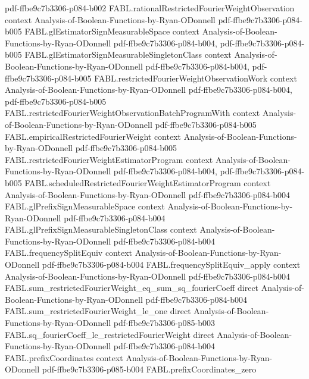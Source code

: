 \begin{theorem}
  {pdf-ffbe9c7b3306-p084-b002}
\proofstep
  {FABL.rationalRestrictedFourierWeightObservation}
  {context}
  {Analysis-of-Boolean-Functions-by-Ryan-ODonnell}
  {pdf-ffbe9c7b3306-p084-b005}
\proofstep
  {FABL.glEstimatorSignMeasurableSpace}
  {context}
  {Analysis-of-Boolean-Functions-by-Ryan-ODonnell}
  {pdf-ffbe9c7b3306-p084-b004,
    pdf-ffbe9c7b3306-p084-b005}
\proofstep
  {FABL.glEstimatorSignMeasurableSingletonClass}
  {context}
  {Analysis-of-Boolean-Functions-by-Ryan-ODonnell}
  {pdf-ffbe9c7b3306-p084-b004,
    pdf-ffbe9c7b3306-p084-b005}
\proofstep
  {FABL.restrictedFourierWeightObservationWork}
  {context}
  {Analysis-of-Boolean-Functions-by-Ryan-ODonnell}
  {pdf-ffbe9c7b3306-p084-b004,
    pdf-ffbe9c7b3306-p084-b005}
\proofstep
  {FABL.restrictedFourierWeightObservationBatchProgramWith}
  {context}
  {Analysis-of-Boolean-Functions-by-Ryan-ODonnell}
  {pdf-ffbe9c7b3306-p084-b005}
\proofstep
  {FABL.empiricalRestrictedFourierWeight}
  {context}
  {Analysis-of-Boolean-Functions-by-Ryan-ODonnell}
  {pdf-ffbe9c7b3306-p084-b005}
\proofstep
  {FABL.restrictedFourierWeightEstimatorProgram}
  {context}
  {Analysis-of-Boolean-Functions-by-Ryan-ODonnell}
  {pdf-ffbe9c7b3306-p084-b004,
    pdf-ffbe9c7b3306-p084-b005}
\proofstep
  {FABL.scheduledRestrictedFourierWeightEstimatorProgram}
  {context}
  {Analysis-of-Boolean-Functions-by-Ryan-ODonnell}
  {pdf-ffbe9c7b3306-p084-b004}
\proofstep
  {FABL.glPrefixSignMeasurableSpace}
  {context}
  {Analysis-of-Boolean-Functions-by-Ryan-ODonnell}
  {pdf-ffbe9c7b3306-p084-b004}
\proofstep
  {FABL.glPrefixSignMeasurableSingletonClass}
  {context}
  {Analysis-of-Boolean-Functions-by-Ryan-ODonnell}
  {pdf-ffbe9c7b3306-p084-b004}
\proofstep
  {FABL.frequencySplitEquiv}
  {context}
  {Analysis-of-Boolean-Functions-by-Ryan-ODonnell}
  {pdf-ffbe9c7b3306-p084-b004}
\proofstep
  {FABL.frequencySplitEquiv_apply}
  {context}
  {Analysis-of-Boolean-Functions-by-Ryan-ODonnell}
  {pdf-ffbe9c7b3306-p084-b004}
\proofstep
  {FABL.sum_restrictedFourierWeight_eq_sum_sq_fourierCoeff}
  {direct}
  {Analysis-of-Boolean-Functions-by-Ryan-ODonnell}
  {pdf-ffbe9c7b3306-p084-b004}
\proofstep
  {FABL.sum_restrictedFourierWeight_le_one}
  {direct}
  {Analysis-of-Boolean-Functions-by-Ryan-ODonnell}
  {pdf-ffbe9c7b3306-p085-b003}
\proofstep
  {FABL.sq_fourierCoeff_le_restrictedFourierWeight}
  {direct}
  {Analysis-of-Boolean-Functions-by-Ryan-ODonnell}
  {pdf-ffbe9c7b3306-p084-b004}
\proofstep
  {FABL.prefixCoordinates}
  {context}
  {Analysis-of-Boolean-Functions-by-Ryan-ODonnell}
  {pdf-ffbe9c7b3306-p085-b004}
\proofstep
  {FABL.prefixCoordinates_zero}

\end{theorem}
